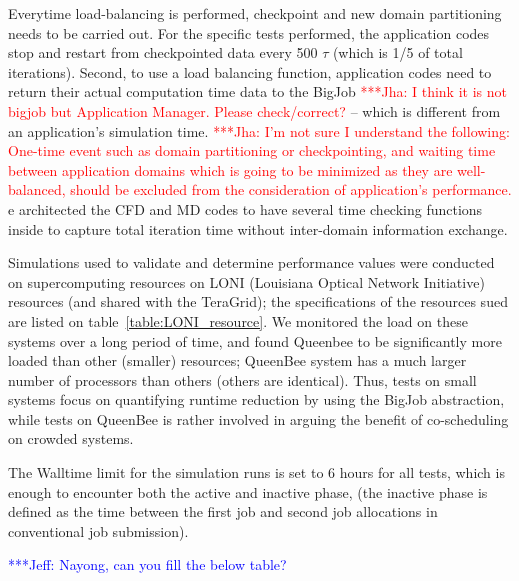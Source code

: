 \documentclass[conference,final]{IEEEtran}
\newcommand{\jhanote}[1]{ {\textcolor{red} { ***Jha: #1 }}}
\newcommand{\skonote}[1]{ {\textcolor{blue} { ***Jeff: #1 }}}
\newcommand{\jhanote}[1]{}
\newcommand{\skonote}[1]{}
\begin{document}

Everytime load-balancing is performed, checkpoint and new domain
partitioning needs to be carried out. For the specific tests
performed, the application codes stop and restart from checkpointed
data every 500 $\tau$ (which is 1/5 of total iterations). Second, to
use a load balancing function, application codes need to return their
actual computation time data to the BigJob \jhanote{I think it is not
  bigjob but Application Manager. Please check/correct?}  -- which is
different from an application's simulation time.  \jhanote{I'm not
  sure I understand the following: One-time event such as domain
  partitioning or checkpointing, and waiting time between application
  domains which is going to be minimized as they are well-balanced,
  should be excluded from the consideration of application's
  performance.}  e architected the CFD and MD codes to have several
time checking functions inside to capture total iteration time without
inter-domain information exchange.

Simulations used to validate and determine performance values were
conducted on supercomputing resources on LONI (Louisiana Optical
Network Initiative)~\cite{LONI_web} resources (and shared with the
TeraGrid); the specifications of the resources sued are listed on
table~\ref{table:LONI_resource}.  We monitored the load on these
systems over a long period of time, and found Queenbee to be
significantly more loaded than other (smaller) resources; QueenBee
system has a much larger number of processors than others (others are
identical). Thus, tests on small systems focus on quantifying runtime
reduction by using the BigJob abstraction, while tests on QueenBee is
rather involved in arguing the benefit of co-scheduling on crowded
systems.

The Walltime limit for the simulation runs is set to 6 hours for all
tests, which is enough to encounter both the active and inactive
phase, (the inactive phase is defined as the time between the first
job and second job allocations in conventional job submission).


\skonote{Nayong, can you fill the below table?}
\end{document}
